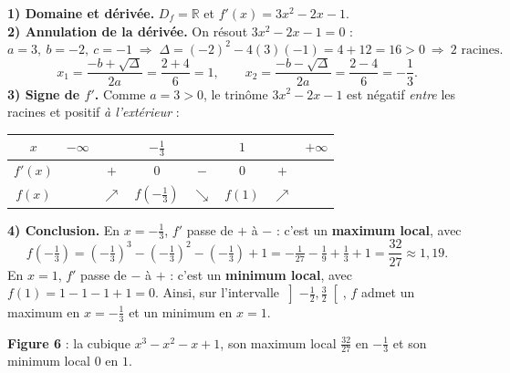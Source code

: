 \documentclass[11pt,a4paper]{article}
\newcommand{\R}{\mathbb{R}}
\newcommand{\Df}{D_f}
\newcommand{\croit}{\textcolor{varcol}{\Large$\nearrow$}}
\newcommand{\decroit}{\textcolor{varcol}{\Large$\searrow$}}
\begin{document}
\begin{exemple}[Étude de $f(x)=x^3-x^2-x+1$ (un maximum \emph{et} un minimum)]
\textbf{1) Domaine et dérivée.} $\Df=\R$ et $f'(x)=3x^2-2x-1$.\\[2pt]
\textbf{2) Annulation de la dérivée.} On résout $3x^2-2x-1=0$ :
\[
  a=3,\ b=-2,\ c=-1 \;\Rightarrow\; \Delta=(-2)^2-4(3)(-1)=4+12=16>0\ \Rightarrow\ \text{2 racines}.
\]
\[
  x_1=\frac{-b+\sqrt{\Delta}}{2a}=\frac{2+4}{6}=1,\qquad
  x_2=\frac{-b-\sqrt{\Delta}}{2a}=\frac{2-4}{6}=-\frac13 .
\]
\textbf{3) Signe de $f'$.} Comme $a=3>0$, le trinôme $3x^2-2x-1$ est négatif
\emph{entre} les racines et positif \emph{à l'extérieur} :

\begin{center}
\renewcommand{\arraystretch}{1.6}\setlength{\tabcolsep}{10pt}
\begin{tabular}{|c|ccccccc|}
\hline
\rowcolor{primarylight}
$x$ & $-\infty$ & & $-\tfrac13$ & & $1$ & & $+\infty$ \\
\hline
$f'(x)$ & & $+$ & $0$ & $-$ & $0$ & $+$ & \\
\hline
$f(x)$ & & \croit & $f\!\left(-\tfrac13\right)$ & \decroit & $f(1)$ & \croit & \\
\hline
\end{tabular}
\end{center}

\textbf{4) Conclusion.} En $x=-\tfrac13$, $f'$ passe de $+$ à $-$ : c'est un
\textbf{maximum local}, avec
\[
  f\!\left(-\tfrac13\right)=\left(-\tfrac13\right)^3-\left(-\tfrac13\right)^2-\left(-\tfrac13\right)+1
  =-\tfrac{1}{27}-\tfrac19+\tfrac13+1=\frac{32}{27}\approx 1{,}19 .
\]
En $x=1$, $f'$ passe de $-$ à $+$ : c'est un \textbf{minimum local}, avec
$f(1)=1-1-1+1=0$. Ainsi, sur l'intervalle $\left]-\tfrac12,\tfrac32\right[$, $f$ admet un
maximum en $x=-\tfrac13$ et un minimum en $x=1$.
\end{exemple}

\begin{center}
\textbf{\textcolor{primary}{Figure 6}} : la cubique $x^3-x^2-x+1$, son maximum local
$\frac{32}{27}$ en $-\frac13$ et son minimum local $0$ en $1$.
\end{center}
\end{document}
